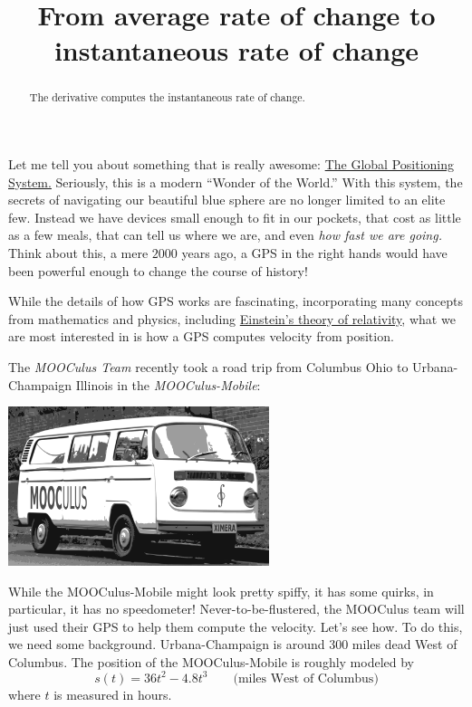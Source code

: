 \documentclass{ximera}
\title{From average rate of change to instantaneous rate of change}
\begin{document}
\begin{abstract}
The derivative computes the instantaneous rate of change. 
\end{abstract}
\maketitle



Let me tell you about something that is really awesome:
\href{http://en.wikipedia.org/wiki/Global_Positioning_System}{The
  Global Positioning System.} Seriously, this is a modern ``Wonder of
the World.'' With this system, the secrets of navigating our beautiful
blue sphere are no longer limited to an elite few. Instead we have
devices small enough to fit in our pockets, that cost as little as a
few meals, that can tell us where we are, and even \textit{how fast we
  are going.} Think about this, a mere $2000$ years ago, a GPS in the
right hands would have been powerful enough to change the course of
history!

While the details of how GPS works are fascinating, incorporating many
concepts from mathematics and physics, including
\href{relativisticEffectsInTheGlobalPositioningSystem.pdf}{Einstein's
  theory of relativity}, what we are most interested in is how a GPS
computes velocity from position.

The \textit{MOOCulus Team} recently took a road trip from Columbus
Ohio to Urbana-Champaign Illinois in the \textit{MOOCulus-Mobile}:
\begin{image}
\includegraphics[width=3in]{mooculusMobile.pdf}
\end{image}
While the MOOCulus-Mobile might look pretty spiffy, it has some
quirks, in particular, it has no speedometer!  Never-to-be-flustered,
the MOOCulus team will just used their GPS to help them compute the
velocity. Let's see how. To do this, we need some
background. Urbana-Champaign is around $300$ miles dead West of
Columbus. The position of the MOOCulus-Mobile is roughly modeled by
\[
s(t) = 36t^2 -4.8t^3 \qquad\text{(miles West of Columbus)} %
\]
where $t$ is measured in hours. 
\end{document}
